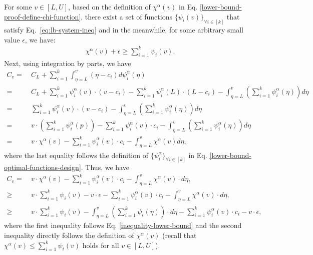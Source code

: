 For some $v \in [L,U]$, based on the definition of $\chi^{\alpha}(v)$ in Eq. \eqref{lower-bound-proof-define-chi-function}, there exist a set of functions ${\{\psi_{i}(v)\}}_{\forall i \in [k]}$ that satisfy Eq.~\eqref{eq:lb-system-ineq} and in the meanwhile, for some arbitrary small value $\epsilon$, we have:
\begin{align}
    \label{inequality-lower-bound}
    \chi^{\alpha}(v) + \epsilon \ge \sum_{i=1}^{k} \psi_{i}(v).
\end{align}
Next, using integration by parts, we have
\begin{align*}
    C_{v}
    =\ & C_{L} + \sum_{i=1}^{k} \int_{\eta =L}^{v} (\eta - c_{i} )d\psi^{\alpha}_{i}(\eta) \\
    =\ & C_{L} + \sum_{i=1}^{k} \psi^{\alpha}_{i}(v) \cdot (v - c_{i}) - \sum_{i=1}^{k} \psi^{\alpha}_{i}(L) \cdot (L - c_{i}) - \int_{\eta =L}^{v} \left( \sum_{i=1}^{k}  \psi^{\alpha}_{i}(\eta) \right) d\eta \\
    =\ &  \sum_{i=1}^{k} \psi^{\alpha}_{i}(v) \cdot (v - c_{i})  - \int_{\eta =L}^{v} \left( \sum_{i=1}^{k}  \psi^{\alpha}_{i}(\eta) \right) d\eta \\
    =\ & v \cdot \left(\sum_{i=1}^{k} \psi^{\alpha}_{i}(p)\right) - \sum_{i=1}^{k} \psi^{\alpha}_{i}(v) \cdot  c_{i}  - \int_{\eta =L}^{v} \left( \sum_{i=1}^{k}  \psi^{\alpha}_{i}(\eta) \right)  d\eta \\
    =\ & v \cdot \chi^{\alpha}(v) -\sum_{i=1}^{k} \psi^{\alpha}_{i}(v) \cdot  c_{i}  - \int_{\eta =L}^{v} \chi^{\alpha}(v) d\eta,
\end{align*}
where the last equality follows the definition of $\{\psi^{\alpha}_{i}\}_{\forall i \in [k]}$ in Eq. \eqref{lower-bound-optimal-functions-design}. Thus, we have
\begin{align}
    C_{v} =\ &  v \cdot \chi^{\alpha}(v) -\sum_{i=1}^{k} \psi^{\alpha}_{i}(v) \cdot  c_{i}  - \int_{\eta =L}^{v} \chi^{\alpha}(v) \cdot d\eta, \nonumber \\
   \ge\ & v \cdot \sum_{i=1}^{k} \psi_{i}(v) - v \cdot \epsilon -\sum_{i=1}^{k} \psi^{\alpha}_{i}(v) \cdot  c_{i}  - \int_{\eta =L}^{v} \chi^{\alpha}(v) \cdot d\eta , \nonumber \\
   \ge\ & v \cdot \sum_{i=1}^{k} \psi_{i}(v) -  \int_{\eta =L}^{v}  \left(\sum_{i=1}^{k} \psi_{i}(\eta)\right)  \cdot d\eta - \sum_{i=1}^{k} \psi^{\alpha}_{i}(v) \cdot  c_{i}  - v \cdot \epsilon, \label{lower-bound-inequality2}
\end{align}
where the first inequality follows Eq. \eqref{inequality-lower-bound} and the second inequality directly follows the definition of $\chi^{\alpha}(v)$ (recall that $\chi^{\alpha}(v) \leq \sum_{i=1}^{k} \psi_{i}(v) $ holds for all $v \in [L,U]$).

